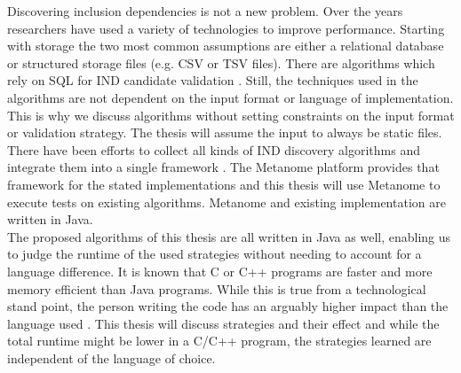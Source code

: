 Discovering inclusion dependencies is not a new problem. Over the years researchers have used a variety of technologies to improve performance. Starting with storage the two most common assumptions are either a relational database or structured storage files (e.g. CSV or TSV files). There are algorithms which rely on SQL for IND candidate validation \cite{bell1995discovery}.
Still, the techniques used in the algorithms are not dependent on the input format or language of implementation. This is why we discuss algorithms without setting constraints on the input format or validation strategy. The thesis will assume the input to always be static files. There have been efforts to collect all kinds of IND discovery algorithms and integrate them into a single framework \cite{dursch2019inclusion}. The Metanome platform \cite{Papenbrock:2015:DPM:2824032.2824086} provides that framework for the stated implementations and this thesis will use Metanome to execute tests on existing algorithms. Metanome and existing implementation are written in Java.
\\

\noindent The proposed algorithms of this thesis are all written in Java as well, enabling us to judge the runtime of the used strategies without needing to account for a language difference. It is known that C or C++ programs are faster and more memory efficient than Java programs. While this is true from a technological stand point, the person writing the code has an arguably higher impact than the language used \cite{prechelt1999technical}. This thesis will discuss strategies and their effect and while the total runtime might be lower in a C/C++ program, the strategies learned are independent of the language of choice. 